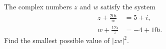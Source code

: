 The complex numbers $z$ and $w$ satisfy the system
\begin{align*}z+\frac{20i}{w}&=5+i,\\w+\frac{12i}{z}&=-4+10i.\end{align*}Find the smallest possible value of $|zw|^2$.